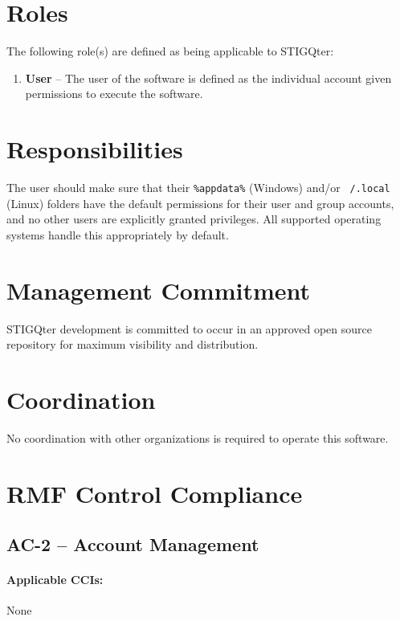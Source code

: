 \documentclass[letterpaper, 10pt, twoside]{article}
\begin{document}
\section{Roles}
\label{sec:roles}

The following role(s) are defined as being applicable to STIGQter:
\begin{enumerate}
	\item \textbf{User} -- The user of the software is defined as the individual account given permissions to execute the software.
\end{enumerate}

\section{Responsibilities}
\label{sec:responsibilities}

The user should make sure that their \texttt{\%appdata\%} (Windows) and/or \texttt{~/.local} (Linux) folders have the default permissions for their user and group accounts, and no other users are explicitly granted privileges. All supported operating systems handle this appropriately by default.

\section{Management Commitment}

STIGQter development is committed to occur in an approved open source repository for maximum visibility and distribution.

\section{Coordination}

No coordination with other organizations is required to operate this software.

\section{RMF Control Compliance}

\subsection{AC-2 -- Account Management}

\paragraph{Applicable CCIs:} None
\end{document}
